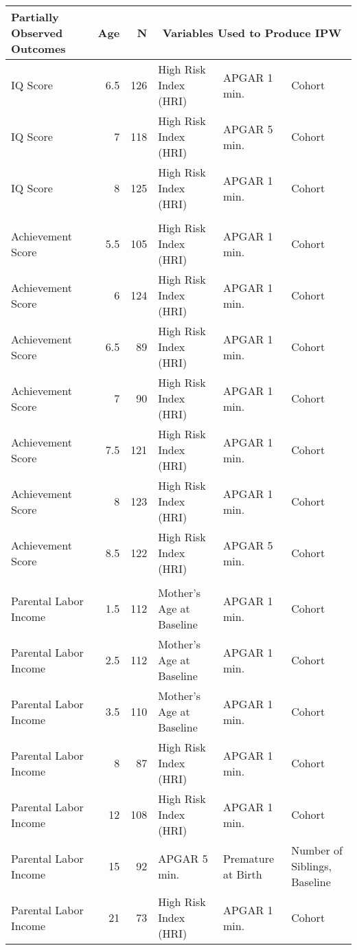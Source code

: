 \scriptsize
\begin{tabular}{l r r l l l}
\toprule											
Partially Observed Outcomes	&	Age	&	N	&	\multicolumn{3}{c}{Variables Used to Produce IPW}	\\
\midrule	
IQ Score 				& 6.5 	& 126   & High Risk Index (HRI)	& APGAR 1 min.	&  Cohort \\
IQ Score 				& 7 	& 118   & High Risk Index (HRI)	& APGAR 5 min.	&  Cohort \\
IQ Score 				& 8 	& 125   & High Risk Index (HRI)	& APGAR 1 min.	&  Cohort \\
\\										
Achievement Score 		& 5.5	& 105 	& High Risk Index (HRI)	& APGAR 1 min.	&  Cohort \\ 
Achievement Score 		& 6		& 124 	& High Risk Index (HRI)	& APGAR 1 min.	&  Cohort \\ 
Achievement Score 		& 6.5	& 89 	& High Risk Index (HRI)	& APGAR 1 min.	&  Cohort \\ 
Achievement Score 		& 7		& 90 	& High Risk Index (HRI)	& APGAR 1 min.	&  Cohort \\ 
Achievement Score 		& 7.5	& 121 	& High Risk Index (HRI)	& APGAR 1 min.	&  Cohort \\ 
Achievement Score 		& 8		& 123 	& High Risk Index (HRI)	& APGAR 1 min.	&  Cohort \\ 
Achievement Score 		& 8.5	& 122 	& High Risk Index (HRI)	& APGAR 5 min.	&  Cohort \\ 
\\
Parental Labor Income	&	1.5	&	112	& Mother's Age at Baseline	& APGAR 1 min.	&  Cohort \\
 Parental Labor Income	&	2.5	&	112	&	Mother's Age at Baseline	& APGAR 1 min.	&  Cohort \\
 Parental Labor Income	&	3.5	&	110	&	Mother's Age at Baseline	& APGAR 1 min.	&  Cohort \\
 Parental Labor Income	&	8	&	87	&	High Risk Index (HRI)	& APGAR 1 min.	&  Cohort \\
 Parental Labor Income	&	12	&	108	&	High Risk Index (HRI)	& APGAR 1 min.	&  Cohort \\
 Parental Labor Income	&	15	&	92	&	APGAR 5 min. & 	Premature at Birth & Number of Siblings, Baseline \\
 Parental Labor Income	&	21	&	73	&	High Risk Index (HRI)	& APGAR 1 min.	&  Cohort \\

\end{tabular}
